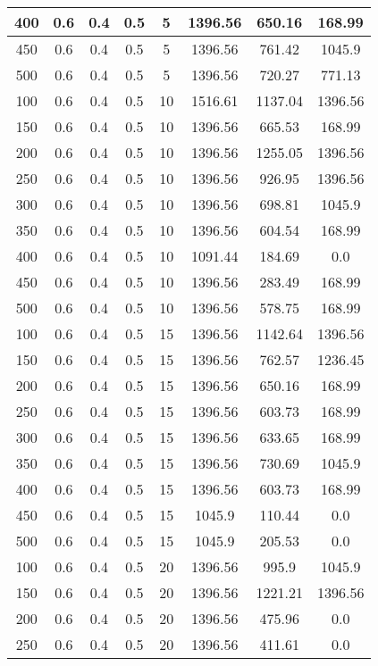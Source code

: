 \documentclass[a4paper, 12pt]{extreport}
\begin{document}
\begin{itemize}
\begin{longtable}{|c|c|c|c|c|c|c|c|}
			400 & 0.6 & 0.4 & 0.5 & 5 & 1396.56 & 650.16 & 168.99 \\\hline
			450 & 0.6 & 0.4 & 0.5 & 5 & 1396.56 & 761.42 & 1045.9 \\\hline
			500 & 0.6 & 0.4 & 0.5 & 5 & 1396.56 & 720.27 & 771.13 \\\hline
			100 & 0.6 & 0.4 & 0.5 & 10 & 1516.61 & 1137.04 & 1396.56 \\\hline
			150 & 0.6 & 0.4 & 0.5 & 10 & 1396.56 & 665.53 & 168.99 \\\hline
			200 & 0.6 & 0.4 & 0.5 & 10 & 1396.56 & 1255.05 & 1396.56 \\\hline
			250 & 0.6 & 0.4 & 0.5 & 10 & 1396.56 & 926.95 & 1396.56 \\\hline
			300 & 0.6 & 0.4 & 0.5 & 10 & 1396.56 & 698.81 & 1045.9 \\\hline
			350 & 0.6 & 0.4 & 0.5 & 10 & 1396.56 & 604.54 & 168.99 \\\hline
			400 & 0.6 & 0.4 & 0.5 & 10 & 1091.44 & 184.69 & 0.0 \\\hline
			450 & 0.6 & 0.4 & 0.5 & 10 & 1396.56 & 283.49 & 168.99 \\\hline
			500 & 0.6 & 0.4 & 0.5 & 10 & 1396.56 & 578.75 & 168.99 \\\hline
			100 & 0.6 & 0.4 & 0.5 & 15 & 1396.56 & 1142.64 & 1396.56 \\\hline
			150 & 0.6 & 0.4 & 0.5 & 15 & 1396.56 & 762.57 & 1236.45 \\\hline
			200 & 0.6 & 0.4 & 0.5 & 15 & 1396.56 & 650.16 & 168.99 \\\hline
			250 & 0.6 & 0.4 & 0.5 & 15 & 1396.56 & 603.73 & 168.99 \\\hline
			300 & 0.6 & 0.4 & 0.5 & 15 & 1396.56 & 633.65 & 168.99 \\\hline
			350 & 0.6 & 0.4 & 0.5 & 15 & 1396.56 & 730.69 & 1045.9 \\\hline
			400 & 0.6 & 0.4 & 0.5 & 15 & 1396.56 & 603.73 & 168.99 \\\hline
			450 & 0.6 & 0.4 & 0.5 & 15 & 1045.9 & 110.44 & 0.0 \\\hline
			500 & 0.6 & 0.4 & 0.5 & 15 & 1045.9 & 205.53 & 0.0 \\\hline
			100 & 0.6 & 0.4 & 0.5 & 20 & 1396.56 & 995.9 & 1045.9 \\\hline
			150 & 0.6 & 0.4 & 0.5 & 20 & 1396.56 & 1221.21 & 1396.56 \\\hline
			200 & 0.6 & 0.4 & 0.5 & 20 & 1396.56 & 475.96 & 0.0 \\\hline
			250 & 0.6 & 0.4 & 0.5 & 20 & 1396.56 & 411.61 & 0.0 \\\hline

\end{longtable}
\end{itemize}
\end{document}
